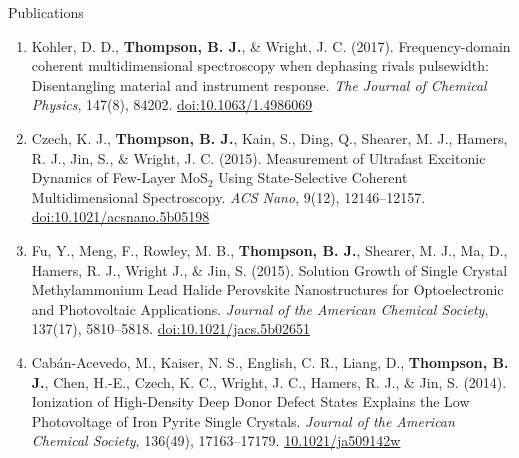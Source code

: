 \documentclass{resume}  %
\begin{document}
\begin{rSection}{Publications}
 
\begin{enumerate}[leftmargin = 0 pt]

  
\item Kohler, D. D., \textbf{Thompson, B. J.}, \& Wright, J. C. (2017). Frequency-domain
  coherent multidimensional spectroscopy when dephasing rivals pulsewidth:
  Disentangling material and instrument response.
  \textit{The Journal of Chemical Physics},
  147(8), 84202.
  \href{https://doi.org/10.1063/1.4986069}{doi:10.1063/1.4986069}

\item Czech, K. J., \textbf{Thompson, B. J.}, Kain, S., Ding, Q., Shearer, M. J., Hamers,
  R. J., Jin, S., \& Wright, J. C. (2015). Measurement of Ultrafast Excitonic Dynamics of
  Few-Layer MoS$_2$ Using State-Selective Coherent Multidimensional Spectroscopy.
  \textit{ACS Nano},
  9(12), 12146–12157.
  \href{https://doi.org/10.1021/acsnano.5b05198}{doi:10.1021/acsnano.5b05198}

\item Fu, Y., Meng, F., Rowley, M. B., \textbf{Thompson, B. J.}, Shearer, M. J.,
  Ma, D., Hamers, R. J., Wright J., \& Jin, S. (2015). Solution Growth of Single Crystal
  Methylammonium Lead Halide Perovskite Nanostructures for Optoelectronic and
  Photovoltaic Applications.
  \textit{Journal of the American Chemical Society},
  137(17), 5810–5818.
  \href{https://doi.org/10.1021/jacs.5b02651}{doi:10.1021/jacs.5b02651}


\item Cabán-Acevedo, M., Kaiser, N. S., English, C. R., Liang, D., \textbf{Thompson, B. J.},
  Chen, H.-E., Czech, K. C., Wright, J. C., Hamers, R. J., \& Jin, S. (2014).
  Ionization of High-Density Deep Donor Defect States Explains the Low
  Photovoltage of Iron Pyrite Single Crystals.
  \textit{Journal of the American Chemical Society},
  136(49), 17163–17179.
  \href{https://doi.org/10.1021/ja509142w}{10.1021/ja509142w}

\end{enumerate}

\end{rSection}
\end{document}

